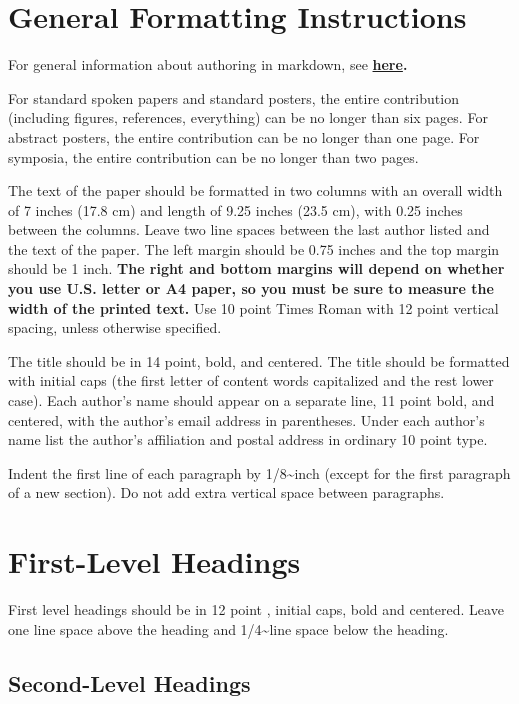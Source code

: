 \documentclass[10pt, letterpaper]{article}
\begin{document}
\section{General Formatting
Instructions}\label{general-formatting-instructions}

For general information about authoring in markdown, see
\textbf{\href{http://rmarkdown.rstudio.com/authoring_basics.html}{here}.}

For standard spoken papers and standard posters, the entire contribution
(including figures, references, everything) can be no longer than six
pages. For abstract posters, the entire contribution can be no longer
than one page. For symposia, the entire contribution can be no longer
than two pages.

The text of the paper should be formatted in two columns with an overall
width of 7 inches (17.8 cm) and length of 9.25 inches (23.5 cm), with
0.25 inches between the columns. Leave two line spaces between the last
author listed and the text of the paper. The left margin should be 0.75
inches and the top margin should be 1 inch.
\textbf{The right and bottom margins will depend on whether you use
U.S. letter or A4 paper, so you must be sure to measure the width of
the printed text.} Use 10 point Times Roman with 12 point vertical
spacing, unless otherwise specified.

The title should be in 14 point, bold, and centered. The title should be
formatted with initial caps (the first letter of content words
capitalized and the rest lower case). Each author's name should appear
on a separate line, 11 point bold, and centered, with the author's email
address in parentheses. Under each author's name list the author's
affiliation and postal address in ordinary 10 point type.

Indent the first line of each paragraph by 1/8\textasciitilde{}inch
(except for the first paragraph of a new section). Do not add extra
vertical space between paragraphs.

\section{First-Level Headings}\label{first-level-headings}

First level headings should be in 12 point , initial caps, bold and
centered. Leave one line space above the heading and
1/4\textasciitilde{}line space below the heading.

\subsection{Second-Level Headings}\label{second-level-headings}
\end{document}
